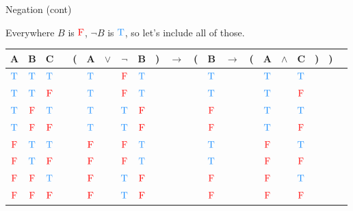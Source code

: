 \documentclass[
  ignorenonframetext,
]{beamer}
\renewcommand{\,}{\text{, }}
\def\True{\textcolor{dodgerblue}{\text{T}}}
\def\False{\textcolor{red}{\text{F}}}
\begin{document}
\begin{frame}{Negation (cont)}
\protect\hypertarget{negation-cont}{}

Everywhere \(B\) is \(\False\), \(\neg B\) is \(\True\), so let's
include all of those.

\begin{center}
\bigskip
\begin{tabular}{@{ }c@{ }@{ }c@{ }@{ }c | c@{ }@{}c@{}@{ }c@{ }@{ }c@{ }@{ }c@{ }@{ }c@{ }@{}c@{}@{ }c@{ }@{}c@{}@{ }c@{ }@{ }c@{ }@{}c@{}@{ }c@{ }@{ }c@{ }@{ }c@{ }@{}c@{}@{}c@{}@{ }c}
A & B & C &  & ( & A & $\vee$ & $\neg$ & B & ) & $\rightarrow$ & ( & B & $\rightarrow$ & ( & A & $\wedge$ & C & ) & ) & \\
\hline 
 $\True$ & $\True$ & $\True$ &  &  & $\True$ && $\False$ & $\True$ &  &&  & $\True$ &&  & $\True$ && $\True$ &  &  & \\
 $\True$ & $\True$ & $\False$ &  &  & $\True$ && $\False$ & $\True$ &  &&  & $\True$ &&  & $\True$ && $\False$ &  &  & \\
 $\True$ & $\False$ & $\True$ &  &  & $\True$ && $\True$ & $\False$ &  &&  & $\False$ &&  & $\True$ && $\True$ &  &  & \\
 $\True$ & $\False$ & $\False$ &  &  & $\True$ && $\True$ & $\False$ &  &&  & $\False$ &&  & $\True$ && $\False$ &  &  & \\
 $\False$ & $\True$ & $\True$ &  &  & $\False$ && $\False$ & $\True$ &  &&  & $\True$ &&  & $\False$ && $\True$ &  &  & \\
 $\False$ & $\True$ & $\False$ &  &  & $\False$ && $\False$ & $\True$ &  &&  & $\True$ &&  & $\False$ && $\False$ &  &  & \\
 $\False$ & $\False$ & $\True$ &  &  & $\False$ && $\True$ & $\False$ &  &&  & $\False$ &&  & $\False$ && $\True$ &  &  & \\
 $\False$ & $\False$ & $\False$ &  &  & $\False$ && $\True$ & $\False$ &  &&  & $\False$ &&  & $\False$ && $\False$ &  &  & \\
\end{tabular}
\bigskip
\end{center}

\end{frame}
\end{document}
